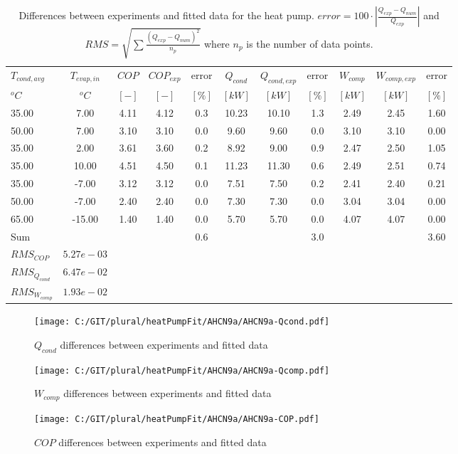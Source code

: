 \documentclass[english]{SPFShortReport}
\begin{document}
\begin{table}[!ht]
\centering
\caption{Differences between experiments and fitted data for the heat pump.          $error=100 \cdot |\frac{Q_{exp}-Q_{num}}{Q_{exp}}|$ and $RMS = \sqrt { \sum{\frac{(Q_{exp}-Q_{num})^2}{n_p}} }$ where $n_p$ is the number of data points.}
\begin{adjustbox}{max width =\textwidth}
\begin{tabular}{l | c c c c c c c c c c } 
\hline
\hline
$T_{cond,avg}$ &$T_{evap,in}$ &$COP$ &$COP_{exp}$ &error &$Q_{cond}$ &$Q_{cond,exp}$ &error &$W_{comp}$ &$W_{comp,exp}$ &error \\ 
$^oC$ &$^oC$ &$[-]$ &$[-]$ &$[\%]$ &$[kW]$ &$[kW]$ &$[\%]$ &$[kW]$ &$[kW]$ &$[\%]$\\ 
\hline
35.00  & 7.00 & 4.11 & 4.12 & 0.3 & 10.23 & 10.10 & 1.3 & 2.49 & 2.45 & 1.60\\ 
50.00  & 7.00 & 3.10 & 3.10 & 0.0 & 9.60 & 9.60 & 0.0 & 3.10 & 3.10 & 0.00\\ 
35.00  & 2.00 & 3.61 & 3.60 & 0.2 & 8.92 & 9.00 & 0.9 & 2.47 & 2.50 & 1.05\\ 
35.00  & 10.00 & 4.51 & 4.50 & 0.1 & 11.23 & 11.30 & 0.6 & 2.49 & 2.51 & 0.74\\ 
35.00  & -7.00 & 3.12 & 3.12 & 0.0 & 7.51 & 7.50 & 0.2 & 2.41 & 2.40 & 0.21\\ 
50.00  & -7.00 & 2.40 & 2.40 & 0.0 & 7.30 & 7.30 & 0.0 & 3.04 & 3.04 & 0.00\\ 
65.00  & -15.00 & 1.40 & 1.40 & 0.0 & 5.70 & 5.70 & 0.0 & 4.07 & 4.07 & 0.00\\ 
\hline 
 Sum &  & &  & 0.6 &  &  & 3.0 & &  & 3.60\\ 
\hline 
 $RMS_{COP}$ & $5.27e-03$ \\ 
 $RMS_{Q_{cond}}$ & $6.47e-02$ \\ 
 $RMS_{W_{comp}}$ & $1.93e-02$ \\ 
\hline
\hline
\end{tabular}
\end{adjustbox}
\label{ErrorsTable}
\end{table}
\begin{figure}[!htbp]
\begin{center}
\texttt{[image: C:/GIT/plural/heatPumpFit/AHCN9a/AHCN9a-Qcond.pdf]}
\caption{$Q_{cond}$ differences between experiments and fitted data}
\label{QcongFig}
\end{center}
\end{figure}
\begin{figure}[!htbp]
\begin{center}
\texttt{[image: C:/GIT/plural/heatPumpFit/AHCN9a/AHCN9a-Qcomp.pdf]}
\caption{$W_{comp}$ differences between experiments and fitted data}
\label{QcompFig}
\end{center}
\end{figure}
\begin{figure}[!htbp]
\begin{center}
\texttt{[image: C:/GIT/plural/heatPumpFit/AHCN9a/AHCN9a-COP.pdf]}
\caption{$COP$ differences between experiments and fitted data}
\label{COPFig}
\end{center}
\end{figure}
\end{document}
